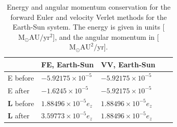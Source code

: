 \documentclass[10pt,showpacs,preprintnumbers,footinbib,amsmath,amssymb,aps,prl,twocolumn,groupedaddress,superscriptaddress,showkeys]{revtex4-1}
\begin{document}
%


\begin{table}[h]
\centering
\caption{Energy and angular momentum conservation for the forward Euler and velocity Verlet methods for the Earth-Sun system. The energy is given in units [$\mathrm{M_\odot AU/yr^2}$], and the angular momentum in [$\mathrm{M_\odot AU^2/yr}$].}
\label{tab:euler_vs_verlet_earth_sun}
\begin{tabular}{l|l|l|l|l}
                       & FE, Earth-Sun     & VV, Earth-Sun\\  
\hline
E before    & $-5.92175\times 10^{-5}$            & $-5.92175\times10^{-5}$            \\
E after     & $-1.6245\times 10^{-5}$             & $-5.92175\times10^{-5}$             \\

\textbf{L} before & $1.88496\times 10^{-5}$\textbf{$e_z$} & $1.88496\times 10^{-5}$\textbf{$e_z$}\\
\textbf{L} after   & $3.59773\times 10^{-5}$\textbf{$e_z$}        & $1.88496\times 10^{-5}$\textbf{$e_z$}
\end{tabular}
\end{table}

\end{document}
